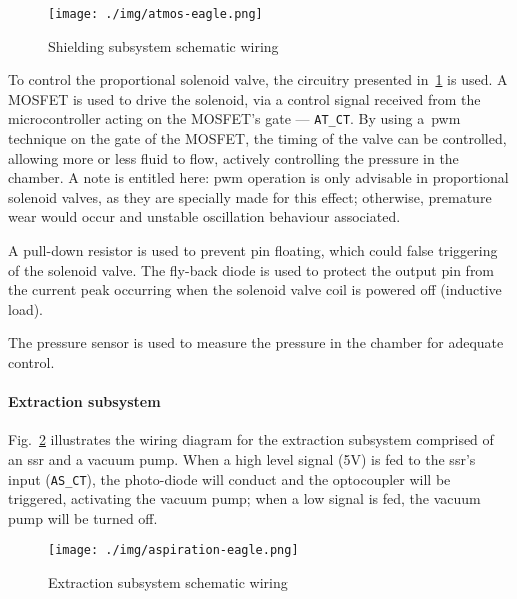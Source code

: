 \begin{figure}[!hbt]
  \centering
  \texttt{[image: ./img/atmos-eagle.png]}
  \caption{Shielding subsystem schematic wiring}%
  \label{fig:atmos-wiring}
\end{figure}

To control the proportional solenoid valve, the circuitry presented in~\ref{fig:atmos-wiring}
is used. A MOSFET is used to drive the solenoid, via a control signal received
from the microcontroller acting on the MOSFET's gate --- \texttt{AT\_CT}. By
using a~\gls{pwm} technique on the gate of the MOSFET, the timing of the valve
can be controlled, allowing more or less fluid to flow, actively controlling the
pressure in the chamber. A note is entitled here: \gls{pwm} operation is only
advisable in proportional solenoid valves, as they are specially made for this
effect; otherwise, premature wear would occur and unstable oscillation behaviour
associated.

A pull-down resistor is used to prevent pin floating, which could false
triggering of the solenoid valve.
The fly-back diode is used to protect the output pin from
the current peak occurring when the solenoid valve coil is powered off (inductive
load).

The pressure sensor is used to measure the pressure
in the chamber for adequate control.

\paragraph{Extraction subsystem}
Fig.~\ref{fig:asp-wiring}
illustrates the wiring diagram for the extraction subsystem comprised of an
\gls{ssr} and a vacuum pump.
When a high level signal (5V) is fed to
the \gls{ssr}'s input (\texttt{AS\_CT}), the photo-diode will conduct and the
optocoupler will be triggered, activating the vacuum pump; when a low signal is
fed, the vacuum pump will be turned off.
% 
 \begin{figure}[!hbt]
   \centering
   \texttt{[image: ./img/aspiration-eagle.png]}
   \caption{Extraction subsystem schematic wiring}%
   \label{fig:asp-wiring}
 \end{figure}
 

